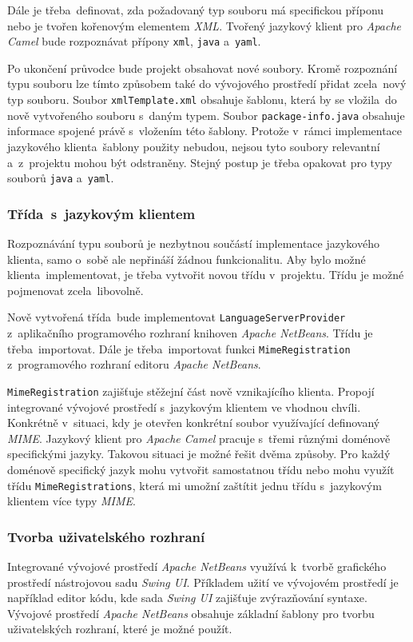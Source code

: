Dále je třeba~definovat, zda požadovaný typ souboru má specifickou příponu nebo je tvořen kořenovým elementem \emph{XML}. Tvořený jazykový klient pro \emph{Apache Camel} bude rozpoznávat přípony \texttt{xml}, \texttt{java} a~\texttt{yaml}.

Po ukončení průvodce bude projekt obsahovat nové soubory. Kromě rozpoznání typu souboru lze tímto způsobem také do vývojového prostředí přidat zcela~nový typ souboru. Soubor \texttt{xmlTemplate.xml} obsahuje šablonu, která by se vložila~do nově vytvořeného souboru s~daným typem. Soubor \texttt{package-info.java} obsahuje informace spojené právě s~vložením této šablony. Protože v~rámci implementace jazykového klienta~šablony použity nebudou, nejsou tyto soubory relevantní a~z~projektu mohou být odstraněny. Stejný postup je třeba opakovat pro typy souborů \texttt{java} a~\texttt{yaml}. 

\subsubsection{Třída~s~jazykovým klientem}
Rozpoznávání typu souborů je nezbytnou součástí implementace jazykového klienta, samo o~sobě ale nepřináší žádnou funkcionalitu. Aby bylo možné klienta~implementovat, je třeba vytvořit novou třídu v~projektu. Třídu je možné pojmenovat zcela~libovolně. 

Nově vytvořená třída~bude implementovat \texttt{LanguageServerProvider} z~aplikačního programového rozhraní knihoven \emph{Apache NetBeans}. Třídu je třeba~importovat. Dále je třeba~importovat funkci \texttt{MimeRegistration} z~programového rozhraní editoru \emph{Apache NetBeans}. 

\texttt{MimeRegistration} zajišťuje stěžejní část nově vznikajícího klienta. Propojí integrované vývojové prostředí s~jazykovým klientem ve vhodnou chvíli. Konkrétně v~situaci, kdy je otevřen konkrétní soubor využívající definovaný \emph{MIME}. Jazykový klient pro \emph{Apache Camel} pracuje s~třemi různými doménově specifickými jazyky. Takovou situaci je možné řešit dvěma způsoby. Pro každý doménově specifický jazyk mohu vytvořit samostatnou třídu nebo mohu využít třídu \texttt{MimeRegistrations}, která mi umožní zaštítit jednu třídu s~jazykovým klientem více typy \emph{MIME}.

\subsubsection{Tvorba uživatelského rozhraní}
Integrované vývojové prostředí \emph{Apache NetBeans} využívá k~tvorbě grafického prostředí nástrojovou sadu \emph{Swing UI}. Příkladem užití ve vývojovém prostředí je například editor kódu, kde sada \emph{Swing UI} zajišťuje zvýrazňování syntaxe. Vývojové prostředí \emph{Apache NetBeans} obsahuje základní šablony pro tvorbu uživatelských rozhraní, které je možné použít.

